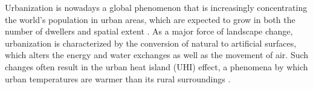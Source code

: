 \documentclass[10pt,letterpaper]{article}
\begin{document}


Urbanization is nowadays a global phenomenon that is increasingly concentrating the world's population in urban areas, which are expected to grow in both the number of dwellers and spatial extent \cite{seto2011meta, angel2012atlas, unitednations2018world}.
As a major force of landscape change, urbanization is characterized by the conversion of natural to artificial surfaces, which alters the energy and water exchanges as well as the movement of air. Such changes often result in the urban heat island (UHI) effect, a phenomena by which urban temperatures are warmer than its rural surroundings \cite{oke1982energetic}. 
\end{document}
